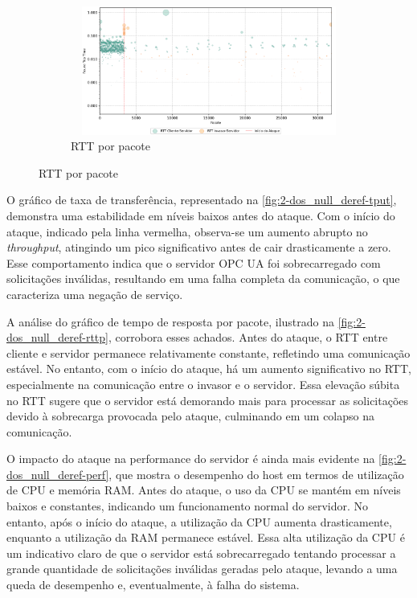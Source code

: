 \begin{figure}[htbp!]
\begin{subfigure}[t]{0.5\textwidth}
                \end{subfigure}%
                ~
                \begin{subfigure}[t]{0.5\textwidth}
                    \centering
                    \caption{\label{fig:2-dos_null_deref-rttp}RTT por pacote}
                    \includegraphics[width=1\textwidth, height=120pt]{USPSC-img/output/cropped/2-dos_function_call_null_deref-rttp.png}
                \end{subfigure}%
            \end{figure}

            O gráfico de taxa de transferência, representado na \autoref{fig:2-dos_null_deref-tput}, demonstra uma estabilidade em níveis baixos antes do ataque. Com o início do ataque, indicado pela linha vermelha, observa-se um aumento abrupto no \textit{throughput}, atingindo um pico significativo antes de cair drasticamente a zero. Esse comportamento indica que o servidor OPC UA foi sobrecarregado com solicitações inválidas, resultando em uma falha completa da comunicação, o que caracteriza uma negação de serviço.

            A análise do gráfico de tempo de resposta por pacote, ilustrado na \autoref{fig:2-dos_null_deref-rttp}, corrobora esses achados. Antes do ataque, o RTT entre cliente e servidor permanece relativamente constante, refletindo uma comunicação estável. No entanto, com o início do ataque, há um aumento significativo no RTT, especialmente na comunicação entre o invasor e o servidor. Essa elevação súbita no RTT sugere que o servidor está demorando mais para processar as solicitações devido à sobrecarga provocada pelo ataque, culminando em um colapso na comunicação.

            O impacto do ataque na performance do servidor é ainda mais evidente na \autoref{fig:2-dos_null_deref-perf}, que mostra o desempenho do host em termos de utilização de CPU e memória RAM. Antes do ataque, o uso da CPU se mantém em níveis baixos e constantes, indicando um funcionamento normal do servidor. No entanto, após o início do ataque, a utilização da CPU aumenta drasticamente, enquanto a utilização da RAM permanece estável. Essa alta utilização da CPU é um indicativo claro de que o servidor está sobrecarregado tentando processar a grande quantidade de solicitações inválidas geradas pelo ataque, levando a uma queda de desempenho e, eventualmente, à falha do sistema.

